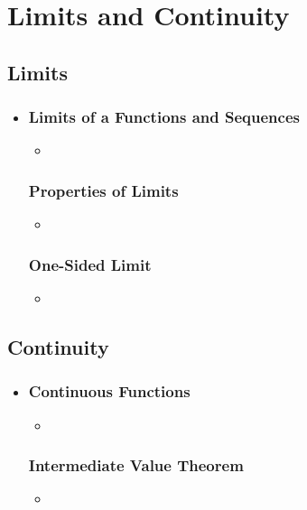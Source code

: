 \chapter{Limits and Continuity}

\section{Limits}
\begin{itemize}
  \item []

  \subsection{Limits of a Functions and Sequences}
  \begin{itemize}
    \item
  \end{itemize}

  \subsection{Properties of Limits}
  \begin{itemize}
    \item
  \end{itemize}

  \subsection{One-Sided Limit}
  \begin{itemize}
    \item
  \end{itemize}
\end{itemize}

\section{Continuity}
\begin{itemize}
  \item []

  \subsection{Continuous Functions}
  \begin{itemize}
    \item
  \end{itemize}

  \subsection{Intermediate Value Theorem}
  \begin{itemize}
    \item
  \end{itemize}

\end{itemize}

